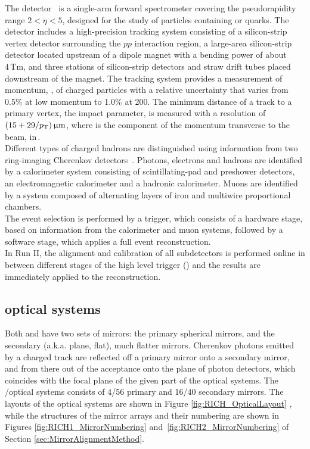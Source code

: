 The \lhcb detector~\cite{Alves:2008zz, LHCb-DP-2014-002} is a single-arm forward spectrometer covering the \mbox{pseudorapidity} range $2<\eta <5$, designed for the study of particles containing \bquark or \cquark quarks. The detector includes a high-precision tracking system consisting of a silicon-strip vertex detector surrounding the $pp$ interaction region, a large-area silicon-strip detector located upstream of a dipole magnet with a bending power of about $4{\mathrm{\,Tm}}$, and three stations of silicon-strip detectors and straw drift tubes placed downstream of the magnet. The tracking system provides a measurement of momentum, \ptot, of charged particles with
a relative uncertainty that varies from 0.5\% at low momentum to 1.0\% at 200\gevc. The minimum distance of a track to a primary vertex, the impact parameter, is measured with a resolution of $(15+29/\mbox{$p_{\rm T}$})\,\upmu\rm m$, where \pt is the component of the momentum transverse to the beam, in\,\gevc. \\
Different types of charged hadrons are distinguished using information from two ring-imaging Cherenkov detectors~\cite{LHCb-DP-2012-003}. Photons, electrons and hadrons are identified by a calorimeter system consisting of scintillating-pad and preshower detectors, an electromagnetic calorimeter and a hadronic calorimeter. Muons are identified by a system composed of alternating layers of iron and multiwire proportional chambers.\\
The event selection is performed by a trigger, which consists of a hardware stage, based on information from the calorimeter and muon systems, followed by a software stage, which applies a full event reconstruction.\\
In Run II, the alignment and calibration of all subdetectors is performed online in between different stages of the high level trigger (\hlt) and the results are immediately applied to the reconstruction.


\subsection {\rich optical systems}

Both \richone and \richtwo have two sets of mirrors: the primary spherical mirrors, and the secondary (a.k.a. plane, flat), much flatter mirrors. Cherenkov photons emitted by a charged track are reflected off a primary mirror onto a secondary mirror, and from there out of the \lhcb acceptance onto the plane of photon detectors, which coincides with the focal plane of the given part of the optical systems. The \richone/\richtwo optical systems consists of 4/56 primary and 16/40 secondary mirrors. The layouts of the \rich optical systems are shown in Figure \ref{fig:RICH_OpticalLayout} \cite{LHCB:2000aa,LHCb:2003ab}, while the structures of the mirror arrays and their numbering are shown in Figures \ref{fig:RICH1_MirrorNumbering} and~\ref{fig:RICH2_MirrorNumbering} of Section \ref{sec:MirrorAlignmentMethod}.

